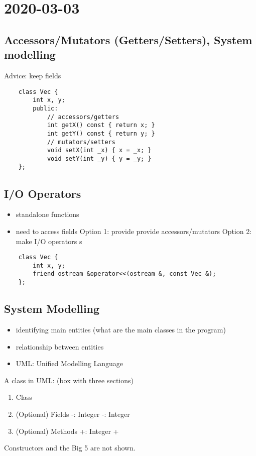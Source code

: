 \section{2020-03-03}
\subsection{Accessors/Mutators (Getters/Setters), System modelling}
Advice: keep fields 

\begin{lstlisting}
    class Vec {
        int x, y;
        public:
            // accessors/getters
            int getX() const { return x; }
            int getY() const { return y; }
            // mutators/setters
            void setX(int _x) { x = _x; }
            void setY(int _y) { y = _y; }
    };
\end{lstlisting}

\subsection{I/O Operators}
\begin{itemize}
    \item standalone functions
    \item need to access fields
          \subitem Option 1: provide provide accessors/mutators
          \subitem Option 2: make I/O operators s
\end{itemize}

\begin{lstlisting}
    class Vec {
        int x, y;
        friend ostream &operator<<(ostream &, const Vec &);
    };
\end{lstlisting}

\subsection{System Modelling}
\begin{itemize}
    \item identifying main entities (what are the main classes in the program)
    \item relationship between entities
    \item UML: Unified Modelling Language
\end{itemize}

A class in UML: (box with three sections)
\begin{enumerate}[(1)]
    \item Class
          \subitem {}
    \item (Optional) Fields
          \subitem -: Integer
          \subitem -: Integer
    \item (Optional) Methods
          \subitem +: Integer
          \subitem +
\end{enumerate}
Constructors and the Big 5 are not shown.

